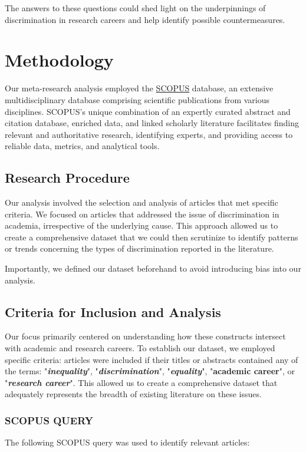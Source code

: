 \documentclass[runningheads]{llncs}
\begin{document}
The answers to these questions could shed light on the underpinnings of discrimination in research careers and help identify possible countermeasures.


\section{Methodology}
Our meta-research analysis employed the \href{https://www.scopus.com/}{SCOPUS} database, an extensive multidisciplinary database comprising scientific publications from various disciplines. SCOPUS's unique combination of an expertly curated abstract and citation database, enriched data, and linked scholarly literature facilitates finding relevant and authoritative research, identifying experts, and providing access to reliable data, metrics, and analytical tools.

\subsection{Research Procedure}
Our analysis involved the selection and analysis of articles that met specific criteria. We focused on articles that addressed the issue of discrimination in academia, irrespective of the underlying cause. This approach allowed us to create a comprehensive dataset that we could then scrutinize to identify patterns or trends concerning the types of discrimination reported in the literature. 

Importantly, we defined our dataset beforehand to avoid introducing bias into our analysis.

\subsection{Criteria for Inclusion and Analysis}
Our focus primarily centered on understanding how these constructs intersect with academic and research careers. To establish our dataset, we employed specific criteria: articles were included if their titles or abstracts contained any of the terms: "\textbf{\textit{inequality}}", "\textbf{\textit{discrimination}}", "\textbf{\textit{equality}}", "\textbf{academic career}", or "\textbf{\textit{research career}}". This allowed us to create a comprehensive dataset that adequately represents the breadth of existing literature on these issues.

\subsubsection{SCOPUS QUERY}
The following SCOPUS query was used to identify relevant articles:
\end{document}
